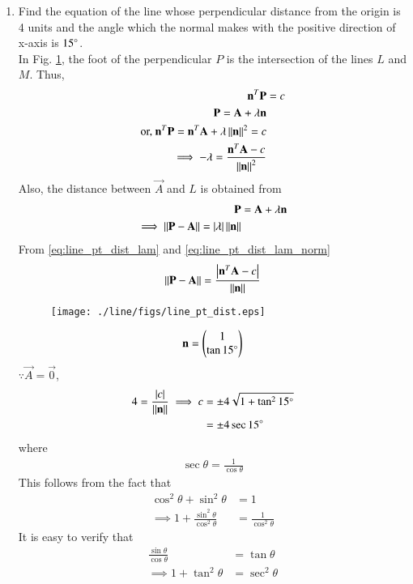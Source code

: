 \begin{enumerate}[label=\arabic*.,ref=\thesubsection.\theenumi]
\item Find the equation of the line whose perpendicular distance from the origin is 4 units and the angle which the normal makes with the positive direction of x-axis is $15\degree$.
%
\\
\solution  In Fig. \ref{fig:line_pt_dist}, the foot of the perpendicular $P$ is the intersection of the lines $L$ and $M$.  Thus, 
\begin{align}
\label{eq:line_pt_dist_foot}
\mathbf{n}^T\mathbf{P} &= c
\\
\label{eq:line_pt_dist_foot_normal}
\mathbf{P} = \mathbf{A} + \lambda\mathbf{n}
\\
\text{or, } \mathbf{n}^T\mathbf{P} = \mathbf{n}^T\mathbf{A} + \lambda\left\lVert\mathbf{n}\right\rVert^2 = c
\\
\label{eq:line_pt_dist_lam}
\implies -\lambda = \frac{\mathbf{n}^T\mathbf{A}-c}{\left\lVert\mathbf{n}\right\rVert^2}
\end{align}
%
Also, the distance between $\vec{A}$ and $L$ is obtained from 
%
\begin{align}
\mathbf{P} &= \mathbf{A} + \lambda\mathbf{n}
\\
\label{eq:line_pt_dist_lam_norm}
\implies \left\lVert\mathbf{P} - \mathbf{A}\right\rVert  = \left\vert\lambda\right\vert\left\lVert\mathbf{n}\right\rVert
\end{align}
%
From \eqref{eq:line_pt_dist_lam}
and \eqref{eq:line_pt_dist_lam_norm}
%
\begin{align}
\label{eq:line_pt_dist}
\left\lVert\mathbf{P} - \mathbf{A}\right\rVert  = \frac{\left\vert\mathbf{n}^T\mathbf{A}-c\right\vert}{\left\lVert\mathbf{n}\right\rVert}
\end{align}
%

\begin{figure}[!ht]
\texttt{[image: ./line/figs/line\_pt\_dist.eps]}
\caption{}
\label{fig:line_pt_dist}
\end{figure}
%
\begin{align}
\mathbf{n} = \begin{pmatrix}1\\\tan 15\degree\end{pmatrix}
\end{align}
%
$\because \vec{A} = \vec{0}$, 
\begin{align}
4 = \frac{\left\vert c\right\vert}{\left\lVert\mathbf{n}\right\rVert} \implies c &= \pm 4\sqrt{1+\tan^2 15\degree} 
\\
&= \pm 4 \sec 15\degree
\end{align}
%
where 
%
\begin{align}
\sec \theta = \frac{1}{\cos \theta}
\end{align}
%
This follows from the fact that
%
\begin{align}
\cos^2 \theta + \sin^2 \theta &= 1
\\
\implies 1 + \frac{\sin^2 \theta}{\cos^2 \theta} &= \frac{1}{\cos^2 \theta}
\end{align}
%
It is easy to verify that 
%
\begin{align}
\frac{\sin \theta}{\cos \theta} &= \tan \theta
\\
\implies 1 + \tan^2 \theta &= \sec^2 \theta
\end{align}
%


\end{enumerate}
